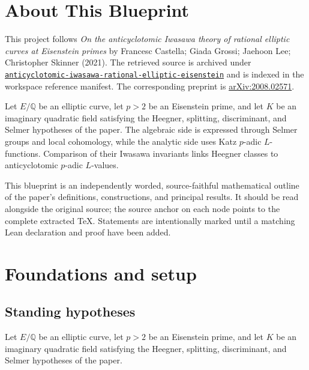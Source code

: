 

\chapter*{About This Blueprint}
\label{anticyclotomic-iwasawa-rational-elliptic-eisenstein-about}

This project follows \emph{On the anticyclotomic Iwasawa theory of rational elliptic curves at Eisenstein primes} by Francesc Castella; Giada Grossi; Jaehoon Lee; Christopher Skinner (2021). The
retrieved source is archived under
\href{../../../../../references/anticyclotomic-iwasawa-rational-elliptic-eisenstein/}{\texttt{anticyclotomic-iwasawa-rational-elliptic-eisenstein}} and is indexed in
the workspace reference manifest. The corresponding preprint is
\href{https://arxiv.org/abs/2008.02571}{arXiv:2008.02571}.

Let $E/\mathbb Q$ be an elliptic curve, let $p>2$ be an Eisenstein prime, and let $K$ be an imaginary quadratic field satisfying the Heegner, splitting, discriminant, and Selmer hypotheses of the paper. The algebraic side is expressed through Selmer groups and local cohomology, while the analytic side uses Katz $p$-adic $L$-functions. Comparison of their Iwasawa invariants links Heegner classes to anticyclotomic $p$-adic $L$-values.

This blueprint is an independently worded, source-faithful mathematical
outline of the paper's definitions, constructions, and principal results. It
should be read alongside the original source; the source anchor on each node
points to the complete extracted TeX. Statements are intentionally marked
\notready until a matching Lean declaration and proof have been added.

\chapter{Foundations and setup}
\label{chap:anticyclotomic-iwasawa-rational-elliptic-eisenstein-foundations}

\section{Standing hypotheses}
\label{sec:anticyclotomic-iwasawa-rational-elliptic-eisenstein-standing}

Let $E/\mathbb Q$ be an elliptic curve, let $p>2$ be an Eisenstein prime, and let $K$ be an imaginary quadratic field satisfying the Heegner, splitting, discriminant, and Selmer hypotheses of the paper.

